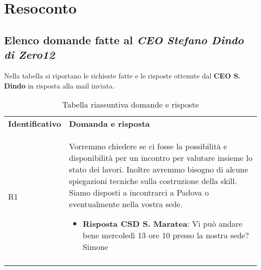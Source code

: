 \clearpage
\section{Resoconto}
	\subsection{Elenco domande fatte al \emph{CEO Stefano Dindo di Zero12}}
	\label{sec:elenco}
	Nella tabella si riportano le richieste fatte e le risposte ottenute dal \textbf{CEO S. Dindo} in risposta alla mail inviata.
		\begin{center}
			\renewcommand{\arraystretch}{1.5}
			\begin{longtable}{  p{2.5cm} p{11.7cm} }
				\rowcolor{tableHeadYellow}
				\textbf{Identificativo}&\textbf{Domanda e risposta}\\
				R1 & Vorremmo chiedere se ci fosse la possibilità e disponibilità per un incontro per valutare insieme lo stato dei lavori.
				Inoltre avremmo bisogno di alcune spiegazioni tecniche sulla costruzione della skill.
				Siamo disposti a incontrarci a Padova o eventualmente nella vostra sede.
				\begin{itemize}
					\item \textbf{Risposta CSD S. Maratea}: Vi può andare bene mercoledì 13 ore 10 presso la nostra sede?
					Simone
				\end{itemize}
				\\
				\rowcolor{white}
				\caption{Tabella riassuntiva domande e risposte}
			\end{longtable}	
		\end{center}
